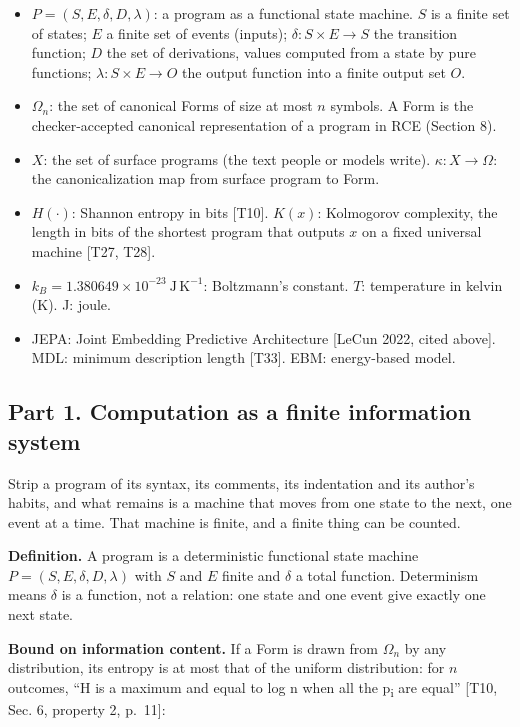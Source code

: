 \documentclass[10pt,letterpaper]{article}
\providecommand{\tightlist}{\setlength{\itemsep}{1pt}\setlength{\parskip}{0pt}}
\begin{document}
\begin{itemize}
\tightlist
\item
  \(P=(S,E,\delta,D,\lambda)\): a program as a functional state machine.
  \(S\) is a finite set of states; \(E\) a finite set of events
  (inputs); \(\delta: S\times E\to S\) the transition function; \(D\)
  the set of derivations, values computed from a state by pure
  functions; \(\lambda: S\times E\to O\) the output function into a
  finite output set \(O\).
\item
  \(\Omega_n\): the set of canonical Forms of size at most \(n\)
  symbols. A Form is the checker-accepted canonical representation of a
  program in RCE (Section 8).
\item
  \(X\): the set of surface programs (the text people or models write).
  \(\kappa: X\to\Omega\): the canonicalization map from surface program
  to Form.
\item
  \(H(\cdot)\): Shannon entropy in bits {[}T10{]}. \(K(x)\): Kolmogorov
  complexity, the length in bits of the shortest program that outputs
  \(x\) on a fixed universal machine {[}T27, T28{]}.
\item
  \(k_B=1.380649\times10^{-23}\ \mathrm{J\,K^{-1}}\): Boltzmann's
  constant. \(T\): temperature in kelvin (K). J: joule.
\item
  JEPA: Joint Embedding Predictive Architecture {[}LeCun 2022, cited
  above{]}. MDL: minimum description length {[}T33{]}. EBM: energy-based
  model.
\end{itemize}

\subsection{Part 1. Computation as a finite information
system}\label{part-1.-computation-as-a-finite-information-system}

Strip a program of its syntax, its comments, its indentation and its
author's habits, and what remains is a machine that moves from one state
to the next, one event at a time. That machine is finite, and a finite
thing can be counted.

\textbf{Definition.} A program is a deterministic functional state
machine \(P=(S,E,\delta,D,\lambda)\) with \(S\) and \(E\) finite and
\(\delta\) a total function. Determinism means \(\delta\) is a function,
not a relation: one state and one event give exactly one next state.

\textbf{Bound on information content.} If a Form is drawn from
\(\Omega_n\) by any distribution, its entropy is at most that of the
uniform distribution: for \(n\) outcomes, ``H is a maximum and equal to
log n when all the p\textsubscript{i} are equal'' {[}T10, Sec. 6,
property 2, p.~11{]}:
\end{document}
